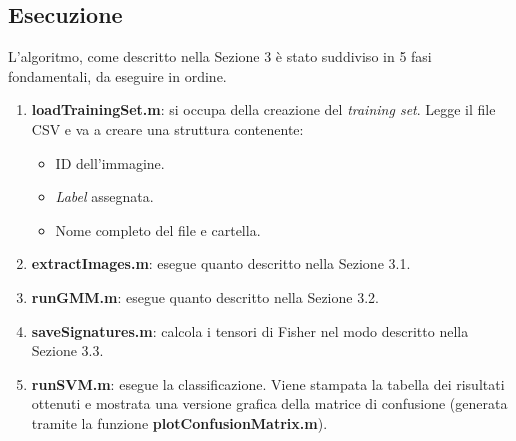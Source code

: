 \subsection{Esecuzione}

L'algoritmo, come descritto nella Sezione 3 è stato suddiviso in 5 fasi fondamentali, da eseguire in ordine.

\begin{enumerate}
\item \textbf{loadTrainingSet.m}: si occupa della creazione del \emph{training set}. Legge il file CSV e va a creare una struttura contenente:
\begin{itemize}
\item ID dell'immagine.
\item \emph{Label} assegnata.
\item Nome completo del file e cartella.
\end{itemize}
\item \textbf{extractImages.m}: esegue quanto descritto nella Sezione 3.1. 
\item \textbf{runGMM.m}: esegue quanto descritto nella Sezione 3.2.
\item \textbf{saveSignatures.m}: calcola i tensori di Fisher nel modo descritto nella Sezione 3.3.
\item \textbf{runSVM.m}: esegue la classificazione. Viene stampata la tabella dei risultati ottenuti e mostrata una versione grafica della matrice di confusione (generata tramite la funzione \textbf{plotConfusionMatrix.m}).
\end{enumerate}
